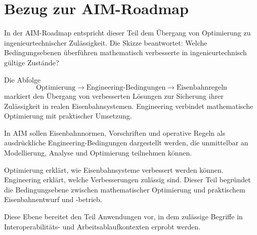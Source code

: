 \section*{Bezug zur AIM-Roadmap}
In der AIM-Roadmap entspricht dieser Teil dem Übergang von Optimierung zu
ingenieurtechnischer Zulässigkeit. Die Skizze beantwortet: Welche
Bedingungsebenen überführen mathematisch verbesserte in ingenieurtechnisch
gültige Zustände?

\begin{center}
\end{center}

Die Abfolge
\[
\text{Optimierung}\rightarrow\text{Engineering-Bedingungen}
\rightarrow\text{Eisenbahnregeln}
\]
markiert den Übergang von verbesserten Lösungen zur Sicherung ihrer
Zulässigkeit in realen Eisenbahnsystemen. Engineering verbindet mathematische
Optimierung mit praktischer Umsetzung.

\begin{principle}
\label{princ:engineering-constraint-principle}
In AIM sollen Eisenbahnnormen, Vorschriften und operative Regeln als
ausdrückliche Engineering-Bedingungen dargestellt werden, die unmittelbar an
Modellierung, Analyse und Optimierung teilnehmen können.
\end{principle}

\begin{summary}
Optimierung erklärt, wie Eisenbahnsysteme verbessert werden können.
Engineering erklärt, welche Verbesserungen zulässig sind. Dieser Teil
begründet die Bedingungsebene zwischen mathematischer Optimierung und
praktischem Eisenbahnentwurf und -betrieb.
\end{summary}

Diese Ebene bereitet den Teil Anwendungen vor, in dem zulässige Begriffe in
Interoperabilitäts- und Arbeitsablaufkontexten erprobt werden.

